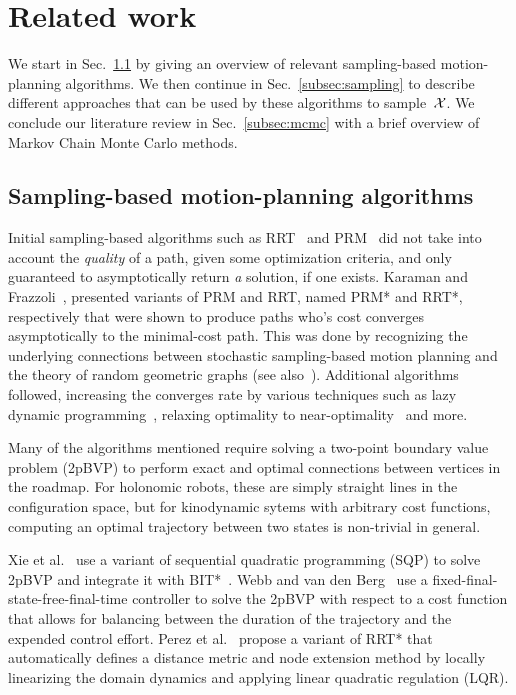 \documentclass[letterpaper, 10 pt, conference]{ieeeconf}  %
\begin{document}

\section{Related work}
\label{sec:related_work}
We start in Sec.~\ref{subsec:planning} by giving an overview of relevant sampling-based motion-planning algorithms.
We then continue in Sec.~\ref{subsec:sampling} to describe different approaches that can be used by  these algorithms to sample~$\mathcal{X}$.
We conclude our literature review in Sec.~\ref{subsec:mcmc} with a brief overview of Markov Chain Monte Carlo methods.

\subsection{Sampling-based motion-planning algorithms}
\label{subsec:planning}
Initial sampling-based algorithms such as RRT~\cite{LK01} and PRM~\cite{KSLO96} did not take into account the \emph{quality} of a path, given some optimization criteria, and only guaranteed to asymptotically return \emph{a} solution, if one exists.
Karaman and Frazzoli~\cite{KF11}, presented variants of PRM and RRT, named PRM* and RRT*, respectively that were shown to produce paths who's cost converges asymptotically to the minimal-cost path.
This was done by recognizing the underlying connections between stochastic sampling-based motion planning and the theory of random geometric graphs (see also~\cite{SSH16}).
Additional algorithms followed, increasing the converges rate by various techniques such as 
lazy dynamic programming~\cite{GSB15, JSCP15, SH15},
relaxing optimality to near-optimality~\cite{DB14, SH16} 
and more.


Many of the algorithms mentioned require solving a two-point boundary value problem (2pBVP) to perform exact and optimal connections between vertices in the roadmap.
For holonomic robots, these are simply straight lines in the configuration space, but for kinodynamic sytems with arbitrary cost functions,  computing an optimal trajectory between two states is non-trivial in general.

Xie et al.~\cite{XBPA15} use a variant of sequential quadratic programming (SQP) to solve 2pBVP and integrate it with BIT*~\cite{GSB15}.
Webb and van den Berg~\cite{WB13} use a fixed-final-state-free-final-time controller to solve the 2pBVP  with respect to a cost function that allows for balancing between the duration of the trajectory and the expended control effort.
Perez et al.~\cite{PPKKL12} propose a variant of RRT* that automatically defines a distance metric and node extension method by locally linearizing
the domain dynamics and applying linear quadratic regulation (LQR).
\end{document}
